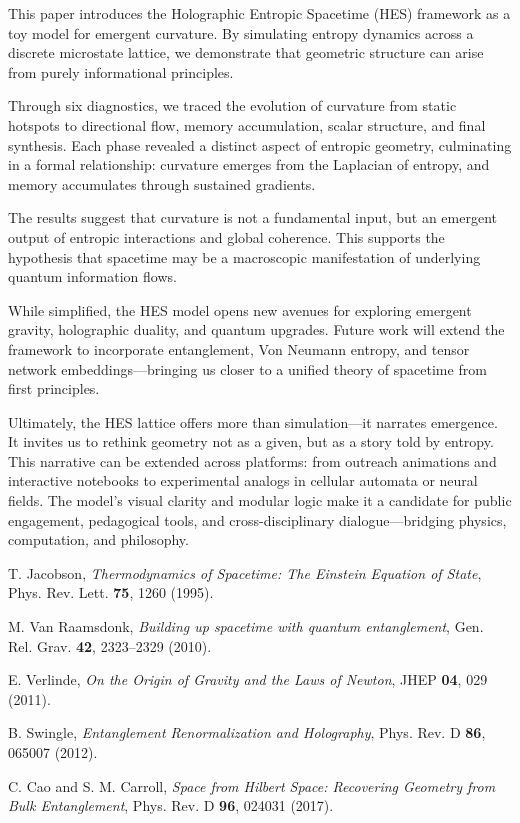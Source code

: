 \documentclass[12pt]{article}
\begin{document}
This paper introduces the Holographic Entropic Spacetime (HES) framework as a toy model for emergent curvature. By simulating entropy dynamics across a discrete microstate lattice, we demonstrate that geometric structure can arise from purely informational principles.

Through six diagnostics, we traced the evolution of curvature from static hotspots to directional flow, memory accumulation, scalar structure, and final synthesis. Each phase revealed a distinct aspect of entropic geometry, culminating in a formal relationship: curvature emerges from the Laplacian of entropy, and memory accumulates through sustained gradients.

The results suggest that curvature is not a fundamental input, but an emergent output of entropic interactions and global coherence. This supports the hypothesis that spacetime may be a macroscopic manifestation of underlying quantum information flows.

While simplified, the HES model opens new avenues for exploring emergent gravity, holographic duality, and quantum upgrades. Future work will extend the framework to incorporate entanglement, Von Neumann entropy, and tensor network embeddings—bringing us closer to a unified theory of spacetime from first principles.

Ultimately, the HES lattice offers more than simulation—it narrates emergence. It invites us to rethink geometry not as a given, but as a story told by entropy. This narrative can be extended across platforms: from outreach animations and interactive notebooks to experimental analogs in cellular automata or neural fields. The model’s visual clarity and modular logic make it a candidate for public engagement, pedagogical tools, and cross-disciplinary dialogue—bridging physics, computation, and philosophy.


\begin{thebibliography}{9}

T. Jacobson, \textit{Thermodynamics of Spacetime: The Einstein Equation of State}, Phys. Rev. Lett. \textbf{75}, 1260 (1995).

M. Van Raamsdonk, \textit{Building up spacetime with quantum entanglement}, Gen. Rel. Grav. \textbf{42}, 2323–2329 (2010).

E. Verlinde, \textit{On the Origin of Gravity and the Laws of Newton}, JHEP \textbf{04}, 029 (2011).

B. Swingle, \textit{Entanglement Renormalization and Holography}, Phys. Rev. D \textbf{86}, 065007 (2012).

C. Cao and S. M. Carroll, \textit{Space from Hilbert Space: Recovering Geometry from Bulk Entanglement}, Phys. Rev. D \textbf{96}, 024031 (2017).

\end{thebibliography}
\end{document}
